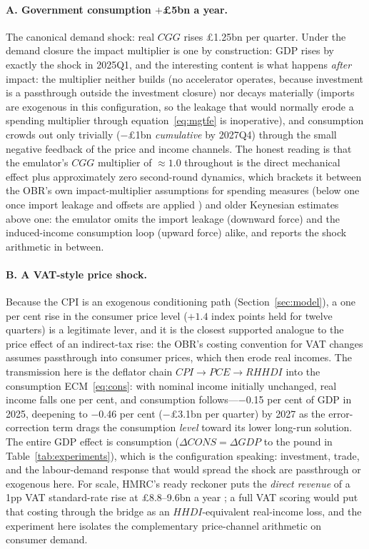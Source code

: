 \paragraph{A. Government consumption $+$\pounds 5bn a year.} The canonical demand shock: real $CGG$ rises \pounds 1.25bn per quarter. Under the demand closure the impact multiplier is one by construction: GDP rises by exactly the shock in 2025Q1, and the interesting content is what happens \emph{after} impact: the multiplier neither builds (no accelerator operates, because investment is a passthrough outside the investment closure) nor decays materially (imports are exogenous in this configuration, so the leakage that would normally erode a spending multiplier through equation~\eqref{eq:mgtfe} is inoperative), and consumption crowds out only trivially ($-$\pounds 1bn \emph{cumulative} by 2027Q4) through the small negative feedback of the price and income channels. The honest reading is that the emulator's $CGG$ multiplier of $\approx 1.0$ throughout is the direct mechanical effect plus approximately zero second-round dynamics, which brackets it between the OBR's own impact-multiplier assumptions for spending measures (below one once import leakage and offsets are applied \citep{obr2014costings}) and older Keynesian estimates above one: the emulator omits the import leakage (downward force) and the induced-income consumption loop (upward force) alike, and reports the shock arithmetic in between.

\paragraph{B. A VAT-style price shock.} Because the CPI is an exogenous conditioning path (Section~\ref{sec:model}), a one per cent rise in the consumer price level ($+1.4$ index points held for twelve quarters) is a legitimate lever, and it is the closest supported analogue to the price effect of an indirect-tax rise: the OBR's costing convention for VAT changes assumes passthrough into consumer prices, which then erode real incomes. The transmission here is the deflator chain $CPI \to PCE \to RHHDI$ into the consumption ECM~\eqref{eq:cons}: with nominal income initially unchanged, real income falls one per cent, and consumption follows---$-$0.15 per cent of GDP in 2025, deepening to $-$0.46 per cent ($-$\pounds 3.1bn per quarter) by 2027 as the error-correction term drags the consumption \emph{level} toward its lower long-run solution. The entire GDP effect is consumption ($\Delta CONS = \Delta GDP$ to the pound in Table~\ref{tab:experiments}), which is the configuration speaking: investment, trade, and the labour-demand response that would spread the shock are passthrough or exogenous here. For scale, HMRC's ready reckoner puts the \emph{direct revenue} of a 1pp VAT standard-rate rise at \pounds 8.8--9.6bn a year \citep{hmrc2025reckoner}; a full VAT scoring would put that costing through the bridge as an $HHDI$-equivalent real-income loss, and the experiment here isolates the complementary price-channel arithmetic on consumer demand.

